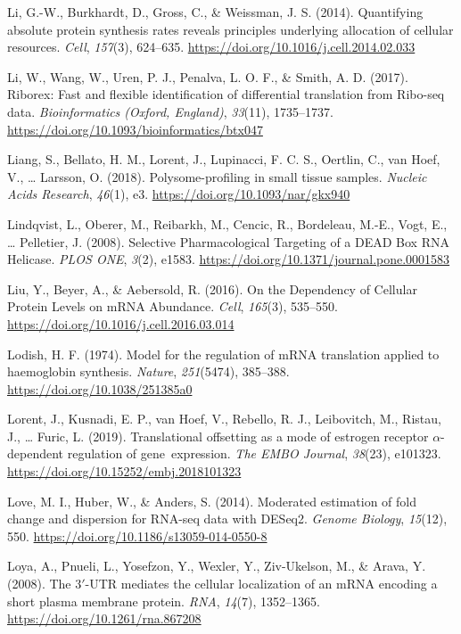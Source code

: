 \documentclass[12pt,openany]{book}
\begin{document}
\hypertarget{ref-Li2014}{}
Li, G.-W., Burkhardt, D., Gross, C., \& Weissman, J. S. (2014).
Quantifying absolute protein synthesis rates reveals principles
underlying allocation of cellular resources. \emph{Cell}, \emph{157}(3),
624--635. \url{https://doi.org/10.1016/j.cell.2014.02.033}

\hypertarget{ref-Li2017}{}
Li, W., Wang, W., Uren, P. J., Penalva, L. O. F., \& Smith, A. D.
(2017). Riborex: Fast and flexible identification of differential
translation from Ribo-seq data. \emph{Bioinformatics (Oxford, England)},
\emph{33}(11), 1735--1737.
\url{https://doi.org/10.1093/bioinformatics/btx047}

\hypertarget{ref-Liang2018}{}
Liang, S., Bellato, H. M., Lorent, J., Lupinacci, F. C. S., Oertlin, C.,
van Hoef, V., \ldots{} Larsson, O. (2018). Polysome-profiling in small
tissue samples. \emph{Nucleic Acids Research}, \emph{46}(1), e3.
\url{https://doi.org/10.1093/nar/gkx940}

\hypertarget{ref-Lindqvist2008}{}
Lindqvist, L., Oberer, M., Reibarkh, M., Cencic, R., Bordeleau, M.-E.,
Vogt, E., \ldots{} Pelletier, J. (2008). Selective Pharmacological
Targeting of a DEAD Box RNA Helicase. \emph{PLOS ONE}, \emph{3}(2),
e1583. \url{https://doi.org/10.1371/journal.pone.0001583}

\hypertarget{ref-Liu2016}{}
Liu, Y., Beyer, A., \& Aebersold, R. (2016). On the Dependency of
Cellular Protein Levels on mRNA Abundance. \emph{Cell}, \emph{165}(3),
535--550. \url{https://doi.org/10.1016/j.cell.2016.03.014}

\hypertarget{ref-Lodish1974}{}
Lodish, H. F. (1974). Model for the regulation of mRNA translation
applied to haemoglobin synthesis. \emph{Nature}, \emph{251}(5474),
385--388. \url{https://doi.org/10.1038/251385a0}

\hypertarget{ref-Lorent2019}{}
Lorent, J., Kusnadi, E. P., van Hoef, V., Rebello, R. J., Leibovitch,
M., Ristau, J., \ldots{} Furic, L. (2019). Translational offsetting as a
mode of estrogen receptor \(\alpha\)-dependent regulation of
gene~expression. \emph{The EMBO Journal}, \emph{38}(23), e101323.
\url{https://doi.org/10.15252/embj.2018101323}

\hypertarget{ref-Love2014}{}
Love, M. I., Huber, W., \& Anders, S. (2014). Moderated estimation of
fold change and dispersion for RNA-seq data with DESeq2. \emph{Genome
Biology}, \emph{15}(12), 550.
\url{https://doi.org/10.1186/s13059-014-0550-8}

\hypertarget{ref-Loya2008}{}
Loya, A., Pnueli, L., Yosefzon, Y., Wexler, Y., Ziv-Ukelson, M., \&
Arava, Y. (2008). The 3\({'}\)-UTR mediates the cellular localization of
an mRNA encoding a short plasma membrane protein. \emph{RNA},
\emph{14}(7), 1352--1365. \url{https://doi.org/10.1261/rna.867208}
\end{document}
